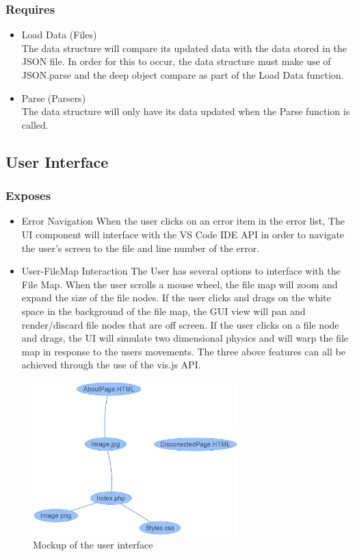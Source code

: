 \documentclass[letterpaper,10pt,titlepage,draftclsnofoot,onecolumn,onesided] {IEEEtran}
\begin{document}
		\subsubsection{Requires}
		\begin{itemize}
			\item Load Data (Files)
			\\
			The data structure will compare its updated data with the data stored in the JSON file. 
			In order for this to occur, the data structure must make use of JSON.parse and the deep object compare as part of the Load Data function. \cite{stringify}
			\item Parse (Parsers)
			\\
			The data structure will only have its data updated when the Parse function is called.
			\end{itemize}
	\subsection{User Interface}
		\subsubsection{Exposes}
		\begin{itemize}
			\item Error Navigation 
			When the user clicks on an error item in the error list, The UI component will interface with the VS Code IDE API in order to navigate the user's screen to the file and line number of the error.
			\item User-FileMap Interaction
			The User has several options to interface with the File Map. 
			When the user scrolls a mouse wheel, the file map will zoom and expand the size of the file nodes.
			If the user clicks and drags on the white space in the background of the file map, the GUI view will pan and render/discard file nodes that are off screen.
			If the user clicks on a file node and drags, the UI will simulate two dimensional physics and will warp the file map in response to the users movements.
			The three above features can all be achieved through the use of the vis.js API.
		\end{itemize}
		
		\begin{figure}
                 \includegraphics[width=300px]{UIMockupEPS.eps}
                 \caption{Mockup of the user interface}
      		\end{figure}
		
\end{document}
